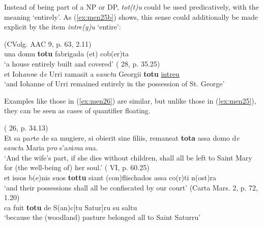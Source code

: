 \documentclass[output=paper,colorlinks,citecolor=brown]{langscibook}
\begin{document}
Instead of being part of a NP or DP, \textit{tot(t)u} could be used predicatively, with the meaning ‘entirely’. As (\ref{ex:men25b}) shows, this sense could additionally be made explicit by the item \textit{intre(g)u} ‘entire’:

\ea\label{ex:men25}
\ea\label{ex:men25a}(CVolg. AAC 9, p. 63, 2.11)\\
 una domu \textbf{totu} fabrigada (et) cob(er)ta\\
‘a house entirely built and covered'
\ex\label{ex:men25b}( 28, p. 35.25)\\
 et Ioh\textit{ann}e d\textit{e} Urri ramasit a s\textit{an}c\textit{t}u Georgii \textbf{totu} \ul{intreu}\\
‘and Iohanne of Urri remained entirely in the possession of St. George’
\z
\z

Examples like those in (\ref{ex:men26}) are similar, but unlike those in (\ref{ex:men25}), they can be seen as cases of quantifier floating.

\ea\label{ex:men26}
\ea ( 26, p. 34.13)\\
Et sa pa\textit{r}te de sa mugiere, si obierit sine filiis, remaneat \textbf{tota} assa domo d\textit{e} s\textit{an}c\textit{t}a Maria p\textit{ro} s'a\textit{n}i\textit{m}a sua.\\
‘And the wife’s part, if she dies without children, shall all be left to Saint Mary for (the well-being of) her soul.’
\ex ( VI, p. 60.25)\\
et issos b(e)nis suos \textbf{tottu} siant (con)flischados assa co(r)ti n(ost)ra\\
‘and their possessions shall all be confiscated by our court’
\ex (Carta Mars. 2, p. 72, 1.20)\\
ca fuit \textbf{totu} de S(an)c[tu Satur]ru su saltu\\
‘because the (woodland) pasture belonged all to Saint Saturru’\\
\z
\z
\end{document}
